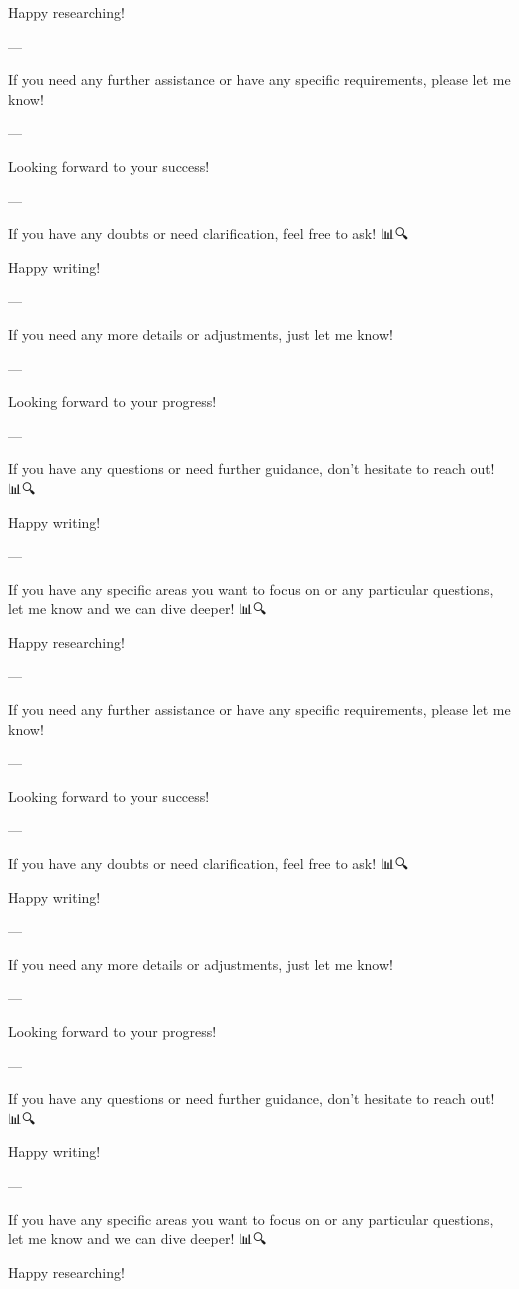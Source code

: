 Happy researching! 📝🚀

--- 

If you need any further assistance or have any specific requirements, please let me know! 🙌

--- 

Looking forward to your success! 🚀🌟

--- 

If you have any doubts or need clarification, feel free to ask! 📊🔍

Happy writing! 📝✨

--- 

If you need any more details or adjustments, just let me know! 🙌

--- 

Looking forward to your progress! 🚀🌟

--- 

If you have any questions or need further guidance, don't hesitate to reach out! 📊🔍

Happy writing! 📝✨

--- 

If you have any specific areas you want to focus on or any particular questions, let me know and we can dive deeper! 📊🔍

Happy researching! 📝🚀

--- 

If you need any further assistance or have any specific requirements, please let me know! 🙌

--- 

Looking forward to your success! 🚀🌟

--- 

If you have any doubts or need clarification, feel free to ask! 📊🔍

Happy writing! 📝✨

--- 

If you need any more details or adjustments, just let me know! 🙌

--- 

Looking forward to your progress! 🚀🌟

--- 

If you have any questions or need further guidance, don't hesitate to reach out! 📊🔍

Happy writing! 📝✨

--- 

If you have any specific areas you want to focus on or any particular questions, let me know and we can dive deeper! 📊🔍

Happy researching! 📝🚀

